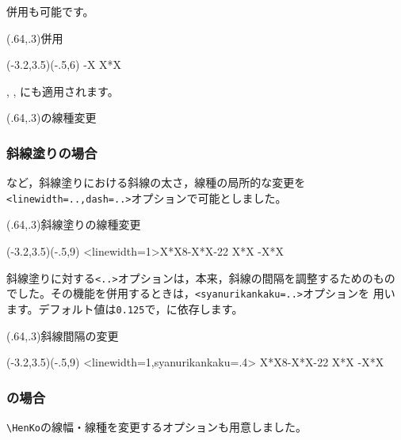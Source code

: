 \documentclass[a4j]{jarticle}
\begin{document}
併用も可能です。

\begin{showEx}(.64,.3){併用}
\begin{pszahyou}[ul=4mm](-3.2,3.5)(-.5,6)
  \def\Fx{X*X}
  \def\Gx{3-X}
  \YGurafu*[linewidth=1,dash={.1,.1}]\Gx
  \YGurafu*\Fx
\end{pszahyou}
\end{showEx}

, , にも適用されます。

\begin{showEx}(.64,.3){の線種変更}
\end{showEx}

\subsubsection{斜線塗りの場合}
など，斜線塗りにおける斜線の太さ，線種の局所的な変更を
\verb+<linewidth=..,dash=..>+オプションで可能としました。

\begin{showEx}(.64,.3){斜線塗りの線種変更}
\begin{pszahyou}[ul=4mm](-3.2,3.5)(-.5,9)
  \def\Fx{X*X}
  \def\Gx{8-X*X}
  \YNurii*<linewidth=1>\Fx\Gx{-2}{2}
  \YGurafu*\Fx
  \YGurafu*\Gx
\end{pszahyou}
\end{showEx}

斜線塗りに対する\verb+<..>+オプションは，本来，斜線の間隔を調整するためのもの
でした。その機能を併用するときは，\verb+<syanurikankaku=..>+オプションを
用います。デフォルト値は\verb+0.125+で，に依存します。

\begin{showEx}(.64,.3){斜線間隔の変更}
\begin{pszahyou}[ul=4mm](-3.2,3.5)(-.5,9)
  \def\Fx{X*X}
  \def\Gx{8-X*X}
  \YNurii*<linewidth=1,syanurikankaku=.4>%
        \Fx\Gx{-2}{2}
  \YGurafu*\Fx
  \YGurafu*\Gx
\end{pszahyou}
\end{showEx}

\subsubsection{\texorpdfstring{}{HenKo}の場合}
\verb+\HenKo+の線幅・線種を変更するオプションも用意しました。
\end{document}
